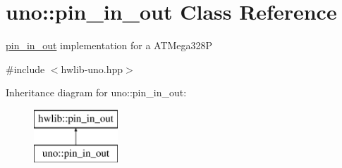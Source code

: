 \hypertarget{classuno_1_1pin__in__out}{}\section{uno\+:\+:pin\+\_\+in\+\_\+out Class Reference}
\label{classuno_1_1pin__in__out}


\hyperlink{classuno_1_1pin__in__out}{pin\+\_\+in\+\_\+out} implementation for a A\+T\+Mega328P  




{\ttfamily \#include $<$hwlib-\/uno.\+hpp$>$}

Inheritance diagram for uno\+:\+:pin\+\_\+in\+\_\+out\+:\begin{figure}[H]
\begin{center}
\leavevmode
\includegraphics[height=2.000000cm]{classuno_1_1pin__in__out}
\end{center}
\end{figure}
